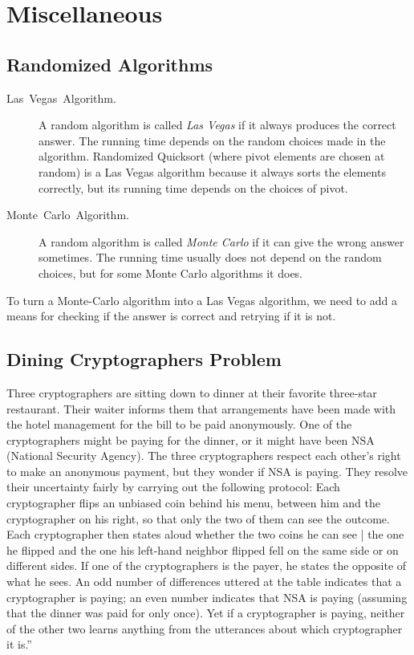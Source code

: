 \documentclass[10pt]{article}
\theoremstyle{plain}
\begin{document}
\section{Miscellaneous}

\subsection{Randomized Algorithms}
\begin{description}
	\item [{Las~Vegas~Algorithm.}] A random algorithm is called \emph{Las
		Vegas} if it always produces the correct answer. The running time
	depends on the random choices made in the algorithm. Randomized Quicksort
	(where pivot elements are chosen at random) is a Las Vegas algorithm
	because it always sorts the elements correctly, but its running time
	depends on the choices of pivot.
	\item [{Monte~Carlo~Algorithm.}] A random algorithm is called \emph{Monte
		Carlo} if it can give the wrong answer sometimes. The running time
	usually does not depend on the random choices, but for some Monte
	Carlo algorithms it does.
\end{description}
To turn a Monte-Carlo algorithm into a Las Vegas algorithm, we need
to add a means for checking if the answer is correct and retrying
if it is not.

\subsection{Dining Cryptographers Problem}

Three cryptographers are sitting down to dinner at their favorite
three-star restaurant. Their waiter informs them that arrangements
have been made with the hotel management for the bill to be paid anonymously.
One of the cryptographers might be paying for the dinner, or it might
have been NSA (National Security Agency). The three cryptographers
respect each other's right to make an anonymous payment, but they
wonder if NSA is paying. They resolve their uncertainty fairly by
carrying out the following protocol: Each cryptographer flips an unbiased
coin behind his menu, between him and the cryptographer on his right,
so that only the two of them can see the outcome. Each cryptographer
then states aloud whether the two coins he can see | the one he flipped
and the one his left-hand neighbor flipped fell on the same side or
on different sides. If one of the cryptographers is the payer, he
states the opposite of what he sees. An odd number of differences
uttered at the table indicates that a cryptographer is paying; an
even number indicates that NSA is paying (assuming that the dinner
was paid for only once). Yet if a cryptographer is paying, neither
of the other two learns anything from the utterances about which cryptographer
it is.''
\end{document}
